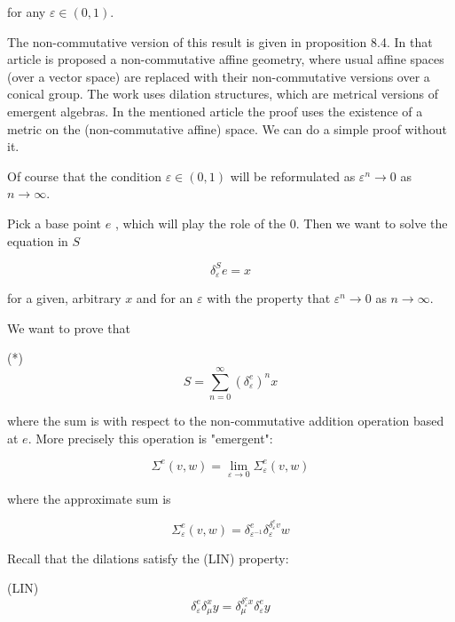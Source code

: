 \documentclass{article}
\begin{document}
for any $\varepsilon \in (0,1)$. 



The non-commutative version of this result is given in \cite{buligainf} proposition 8.4. 
In that article is proposed a non-commutative affine geometry, where usual affine spaces (over a vector space) are replaced with their non-commutative versions over a conical group.  The work uses dilation structures, which are metrical versions of emergent algebras. In the mentioned article  the proof uses the existence of a metric on the (non-commutative affine) space. We can do a simple proof without it. 



Of course that the condition $\varepsilon \in (0,1)$ will be reformulated as $\varepsilon^{n} \rightarrow 0$ as $n \rightarrow \infty$. 



Pick a base point $e$ , which will play the role of the $0$. Then we want to solve the equation in $S$ 



$$ \delta^{S}_{\varepsilon} e = x$$



for a given, arbitrary $x$ and for an $\varepsilon$ with the property that $\varepsilon^{n} \rightarrow 0$ as $n \rightarrow \infty$.



We want to prove that 



(*) $$S = \sum_{n=0}^{\infty} \left( \delta^{e}_{\varepsilon}\right)^{n} x$$



where the sum is with respect to the non-commutative addition operation based at $e$. More precisely this operation is "emergent":



$$ \Sigma^{e} (v, w)  = \lim_{\varepsilon \rightarrow 0} \Sigma^{e}_{\varepsilon}(v,w)$$



where the approximate sum is 



$$ \Sigma^{e}_{\varepsilon}(v,w) = \delta^{e}_{\varepsilon^{-1}} \delta^{\delta^{e}_{\varepsilon} v}_{\varepsilon} w$$



Recall that the dilations satisfy the (LIN) property: 



(LIN) $$\delta^{e}_{\varepsilon} \delta^{x}_{\mu} y = \delta^{\delta^{e}_{\varepsilon} x}_{\mu} \delta^{e}_{\varepsilon} y$$
\end{document}
